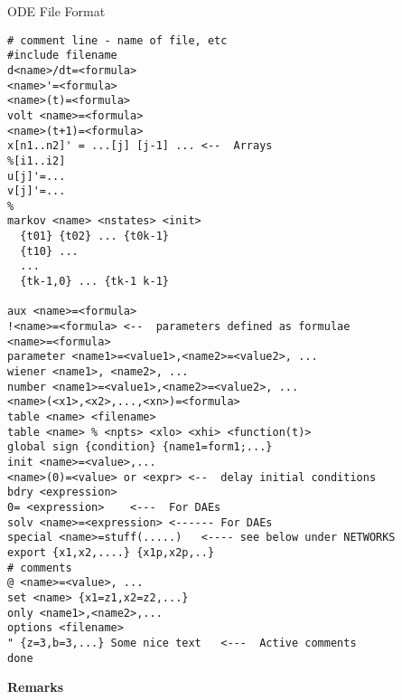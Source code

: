 \begin{center} {\large ODE File Format}\end{center}
\begin{verbatim}
# comment line - name of file, etc
#include filename   
d<name>/dt=<formula>
<name>'=<formula>
<name>(t)=<formula>
volt <name>=<formula>
<name>(t+1)=<formula>
x[n1..n2]' = ...[j] [j-1] ... <--  Arrays
%[i1..i2]
u[j]'=...
v[j]'=...
% 
markov <name> <nstates> <init>
  {t01} {t02} ... {t0k-1}
  {t10} ...
  ...
  {tk-1,0} ... {tk-1 k-1}

aux <name>=<formula>
!<name>=<formula> <--  parameters defined as formulae
<name>=<formula>
parameter <name1>=<value1>,<name2>=<value2>, ...
wiener <name1>, <name2>, ...
number <name1>=<value1>,<name2>=<value2>, ...
<name>(<x1>,<x2>,...,<xn>)=<formula>
table <name> <filename>
table <name> % <npts> <xlo> <xhi> <function(t)>
global sign {condition} {name1=form1;...}
init <name>=<value>,...
<name>(0)=<value> or <expr> <--  delay initial conditions
bdry <expression>
0= <expression>    <---  For DAEs
solv <name>=<expression> <------ For DAEs
special <name>=stuff(.....)   <---- see below under NETWORKS
export {x1,x2,....} {x1p,x2p,..}     
# comments
@ <name>=<value>, ...
set <name> {x1=z1,x2=z2,...}
only <name1>,<name2>,...
options <filename>
" {z=3,b=3,...} Some nice text   <---  Active comments 
done
\end{verbatim}
{\bf Remarks}
